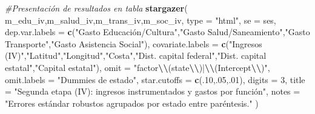 \documentclass[
]{article}
\newenvironment{Shaded}{\begin{snugshade}}{\end{snugshade}}
\newcommand{\AttributeTok}[1]{\textcolor[rgb]{0.13,0.29,0.53}{#1}}
\newcommand{\CommentTok}[1]{\textcolor[rgb]{0.56,0.35,0.01}{\textit{#1}}}
\newcommand{\DecValTok}[1]{\textcolor[rgb]{0.00,0.00,0.81}{#1}}
\newcommand{\FunctionTok}[1]{\textcolor[rgb]{0.13,0.29,0.53}{\textbf{#1}}}
\newcommand{\NormalTok}[1]{#1}
\newcommand{\SpecialCharTok}[1]{\textcolor[rgb]{0.81,0.36,0.00}{\textbf{#1}}}
\newcommand{\StringTok}[1]{\textcolor[rgb]{0.31,0.60,0.02}{#1}}
\begin{document}
\begin{Shaded}
\begin{Highlighting}[]
\CommentTok{\#Presentación de resultados en tabla}
\FunctionTok{stargazer}\NormalTok{(}
\NormalTok{  m\_edu\_iv,m\_salud\_iv,m\_trans\_iv,m\_soc\_iv,}
  \AttributeTok{type =} \StringTok{"html"}\NormalTok{, }\AttributeTok{se =}\NormalTok{ ses,}
  \AttributeTok{dep.var.labels =} \FunctionTok{c}\NormalTok{(}\StringTok{"Gasto Educación/Cultura"}\NormalTok{,}\StringTok{"Gasto Salud/Saneamiento"}\NormalTok{,}\StringTok{"Gasto Transporte"}\NormalTok{,}\StringTok{"Gasto Asistencia Social"}\NormalTok{),}
  \AttributeTok{covariate.labels =} \FunctionTok{c}\NormalTok{(}\StringTok{"Ingresos (IV)"}\NormalTok{,}\StringTok{"Latitud"}\NormalTok{,}\StringTok{"Longitud"}\NormalTok{,}\StringTok{"Costa"}\NormalTok{,}\StringTok{"Dist. capital federal"}\NormalTok{,}\StringTok{"Dist. capital estatal"}\NormalTok{,}\StringTok{"Capital estatal"}\NormalTok{),}
  \AttributeTok{omit =} \StringTok{"factor}\SpecialCharTok{\textbackslash{}\textbackslash{}}\StringTok{(state}\SpecialCharTok{\textbackslash{}\textbackslash{}}\StringTok{)|}\SpecialCharTok{\textbackslash{}\textbackslash{}}\StringTok{(Intercept}\SpecialCharTok{\textbackslash{}\textbackslash{}}\StringTok{)"}\NormalTok{, }\AttributeTok{omit.labels =} \StringTok{"Dummies de estado"}\NormalTok{,}
  \AttributeTok{star.cutoffs =} \FunctionTok{c}\NormalTok{(.}\DecValTok{10}\NormalTok{,.}\DecValTok{05}\NormalTok{,.}\DecValTok{01}\NormalTok{), }\AttributeTok{digits =} \DecValTok{3}\NormalTok{,}
  \AttributeTok{title =} \StringTok{"Segunda etapa (IV): ingresos instrumentados y gastos por función"}\NormalTok{,}
  \AttributeTok{notes =} \StringTok{"Errores estándar robustos agrupados por estado entre paréntesis."}
\NormalTok{)}
\end{Highlighting}
\end{Shaded}
\end{document}
